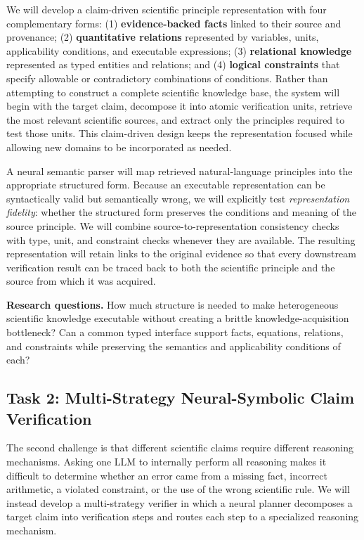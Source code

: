 \documentclass[12pt]{article}
\begin{document}
We will develop a claim-driven scientific principle representation with four complementary forms: (1) \textbf{evidence-backed facts} linked to their source and provenance; (2) \textbf{quantitative relations} represented by variables, units, applicability conditions, and executable expressions; (3) \textbf{relational knowledge} represented as typed entities and relations; and (4) \textbf{logical constraints} that specify allowable or contradictory combinations of conditions. Rather than attempting to construct a complete scientific knowledge base, the system will begin with the target claim, decompose it into atomic verification units, retrieve the most relevant scientific sources, and extract only the principles required to test those units. This claim-driven design keeps the representation focused while allowing new domains to be incorporated as needed.

A neural semantic parser will map retrieved natural-language principles into the appropriate structured form. Because an executable representation can be syntactically valid but semantically wrong, we will explicitly test \emph{representation fidelity}: whether the structured form preserves the conditions and meaning of the source principle. We will combine source-to-representation consistency checks with type, unit, and constraint checks whenever they are available. The resulting representation will retain links to the original evidence so that every downstream verification result can be traced back to both the scientific principle and the source from which it was acquired.

\textbf{Research questions.} How much structure is needed to make heterogeneous scientific knowledge executable without creating a brittle knowledge-acquisition bottleneck? Can a common typed interface support facts, equations, relations, and constraints while preserving the semantics and applicability conditions of each?

\subsection*{Task 2: Multi-Strategy Neural-Symbolic Claim Verification}

The second challenge is that different scientific claims require different reasoning mechanisms. Asking one LLM to internally perform all reasoning makes it difficult to determine whether an error came from a missing fact, incorrect arithmetic, a violated constraint, or the use of the wrong scientific rule. We will instead develop a multi-strategy verifier in which a neural planner decomposes a target claim into verification steps and routes each step to a specialized reasoning mechanism.
\end{document}
